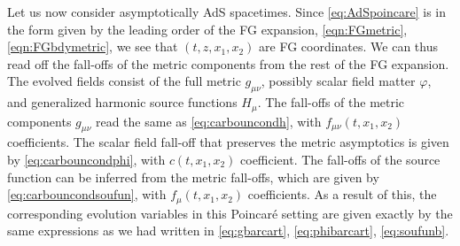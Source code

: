 \documentclass[a4paper,11pt]{article}
\numberwithin{equation}{section}
\begin{document}
Let us now consider asymptotically AdS spacetimes.
Since \eqref{eq:AdSpoincare} is in the form given by the leading order of the FG expansion, \eqref{eqn:FGmetric}, \eqref{eqn:FGbdymetric}, we see that $(t,z,x_1,x_2)$ are FG coordinates.
We can thus read off the fall-offs of the metric components from the rest of the FG expansion.
The evolved fields consist of the full metric $g_{\mu\nu}$, possibly scalar field matter $\varphi$, and generalized harmonic source functions $H_\mu$.
The fall-offs of the metric components $g_{\mu\nu}$ read the same as \eqref{eq:carbouncondh}, with $f_{\mu\nu}(t,x_1,x_2)$ coefficients.
The scalar field fall-off that preserves the metric asymptotics is given by \eqref{eq:carbouncondphi}, with $c(t,x_1,x_2)$ coefficient.
The fall-offs of the source function can be inferred from the metric fall-offs, which are given by \eqref{eq:carbouncondsoufun}, with $f_{\mu}(t,x_1,x_2)$ coefficients.
As a result of this, the corresponding evolution variables in this Poincar\'e setting are given exactly by the same expressions as we had written in \eqref{eq:gbarcart}, \eqref{eq:phibarcart}, \eqref{eq:soufunb}.

\end{document}
